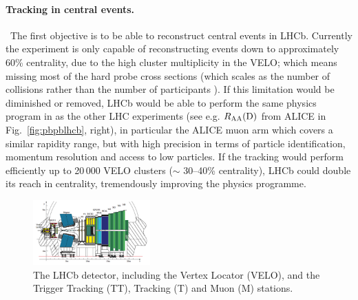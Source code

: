 \documentclass[a4paper,11pt]{article}
\newcommand{\ER}{ER\xspace}
\begin{document}
\paragraph{Tracking in central \pbpb events. }\ 
The first objective is to be able to reconstruct central events in LHCb. Currently the experiment is only capable of reconstructing \pbpb events down to approximately 60\% centrality, due to the high cluster multiplicity in the VELO; which means missing most of the hard probe cross sections (which scales as the number of collisions \ncoll rather than the number of participants \npart). 
If this limitation would be diminished or removed, LHCb would be able to perform the same physics program in \pbpb as the other LHC experiments (see e.g. $R_{\text{AA}}(\text{D})$ from ALICE in Fig.~\ref{fig:pbpblhcb}, right), in particular the ALICE muon arm which covers a similar rapidity range, but with high precision in terms of particle identification, momentum resolution and access to low \pt particles. If the tracking would perform efficiently up to 20\,000 VELO clusters ($\sim$ 30--40\% centrality), LHCb could double its reach in centrality, tremendously improving the \pbpb physics programme.


\begin{figure}
\vspace{-10pt}
  \begin{center}
    \includegraphics[width=0.4\textwidth]{plots/lhcblayout.png}
  \end{center}
  \vspace{-15pt}
  \caption{The LHCb detector, including the Vertex Locator (VELO), and the Trigger Tracking (TT), Tracking (T) and Muon (M) stations. \label{fig:lhcb}}
\end{figure}
\end{document}
